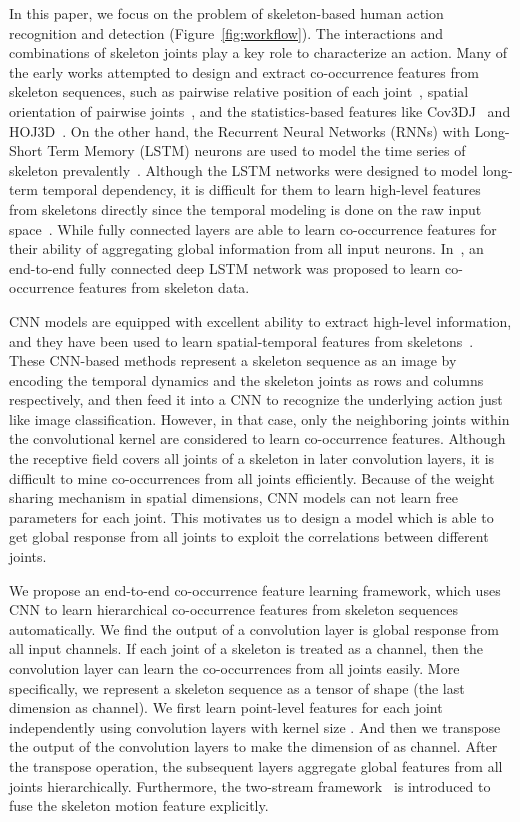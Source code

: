 \documentclass{article}
\begin{document}
In this paper, we focus on the problem of skeleton-based human action recognition and detection (Figure~\ref{fig:workflow}). The interactions and combinations of skeleton joints play a key role to characterize an action. Many of the early works attempted to design and extract co-occurrence features from skeleton sequences, such as pairwise relative position of each joint~\cite{Wang2014Learning}, spatial orientation of pairwise joints~\cite{Jin2012Essential}, and the statistics-based features like Cov3DJ~\cite{Hussein2013Human} and HOJ3D~\cite{hog3D}. On the other hand, the Recurrent Neural Networks (RNNs) with Long-Short Term Memory (LSTM) neurons are used to model the time series of skeleton prevalently~\cite{NTURGBD,song2016end,trust_gate}. Although the LSTM networks were designed to model long-term temporal dependency, it is difficult for them to learn high-level features from skeletons directly since the temporal modeling is done on the raw input space~\cite{Sainath2015}. While fully connected layers are able to learn co-occurrence features for their ability of aggregating global information from all input neurons. In~\cite{co_occurrence}, an end-to-end fully connected deep LSTM network was proposed to learn co-occurrence features from skeleton data.

CNN models are equipped with excellent ability to extract high-level information, and they have been used to learn spatial-temporal features from skeletons~\cite{Du2016Skeleton,Ke_2017_CVPR}. These CNN-based methods represent a skeleton sequence as an image by encoding the temporal dynamics and the skeleton joints as rows and columns respectively, and then feed it into a CNN to recognize the underlying action just like image classification. However, in that case, only the neighboring joints within the convolutional kernel are considered to learn co-occurrence features. Although the receptive field covers all joints of a skeleton in later convolution layers, it is difficult to mine co-occurrences from all joints efficiently. Because of the weight sharing mechanism in spatial dimensions, CNN models can not learn free parameters for each joint.
This motivates us to design a model which is able to get global response from all joints to exploit the correlations between different joints.

We propose an end-to-end co-occurrence feature learning framework, which uses CNN to learn hierarchical co-occurrence features from skeleton sequences automatically. We find the output of a convolution layer is global response from all input channels. If each joint of a skeleton is treated as a channel, then the convolution layer can learn the co-occurrences from all joints easily.  More specifically, we represent a skeleton sequence as a tensor of shape  (the last dimension as channel). We first learn point-level features for each joint independently using convolution layers with kernel size . And then we transpose the output of the convolution layers to make the dimension of  as channel. After the transpose operation, the subsequent layers aggregate global features from all joints hierarchically. Furthermore, the two-stream framework~\cite{NIPS2014_5353} is introduced to fuse the skeleton motion feature explicitly.
\end{document}
